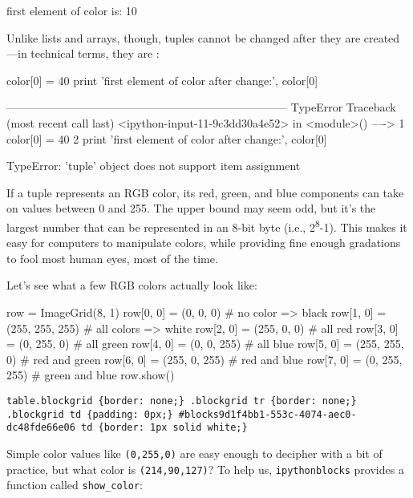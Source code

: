 \documentclass{book}
\begin{document}
\begin{VerbOut}
first element of color is: 10
\end{VerbOut}

Unlike lists and arrays, though, tuples cannot be changed after they are
created---in technical terms, they are
:

\begin{VerbIn}
color[0] = 40
print 'first element of color after change:', color[0]
\end{VerbIn}

\begin{VerbErr}
---------------------------------------------------------------------------
TypeError                                 Traceback (most recent call last)
<ipython-input-11-9c3dd30a4e52> in <module>()
----> 1 color[0] = 40
      2 print 'first element of color after change:', color[0]

TypeError: 'tuple' object does not support item assignment
\end{VerbErr}

If a tuple represents an RGB color, its red, green, and blue components
can take on values between 0 and 255. The upper bound may seem odd, but
it's the largest number that can be represented in an 8-bit byte (i.e.,
2\textsuperscript{8}-1). This makes it easy for computers to manipulate
colors, while providing fine enough gradations to fool most human eyes,
most of the time.

Let's see what a few RGB colors actually look like:

\begin{VerbIn}
row = ImageGrid(8, 1)
row[0, 0] = (0, 0, 0)   # no color => black
row[1, 0] = (255, 255, 255) # all colors => white
row[2, 0] = (255, 0, 0) # all red
row[3, 0] = (0, 255, 0) # all green
row[4, 0] = (0, 0, 255) # all blue
row[5, 0] = (255, 255, 0) # red and green
row[6, 0] = (255, 0, 255) # red and blue
row[7, 0] = (0, 255, 255) # green and blue
row.show()
\end{VerbIn}

\begin{Verbatim}
table.blockgrid {border: none;} .blockgrid tr {border: none;} .blockgrid td {padding: 0px;} #blocks9d1f4bb1-553c-4074-aec0-dc48fde66e06 td {border: 1px solid white;}
\end{Verbatim}

Simple color values like \texttt{(0,255,0)} are easy enough to decipher
with a bit of practice, but what color is \texttt{(214,90,127)}? To help
us, \texttt{ipythonblocks} provides a function called
\texttt{show\_color}:
\end{document}
